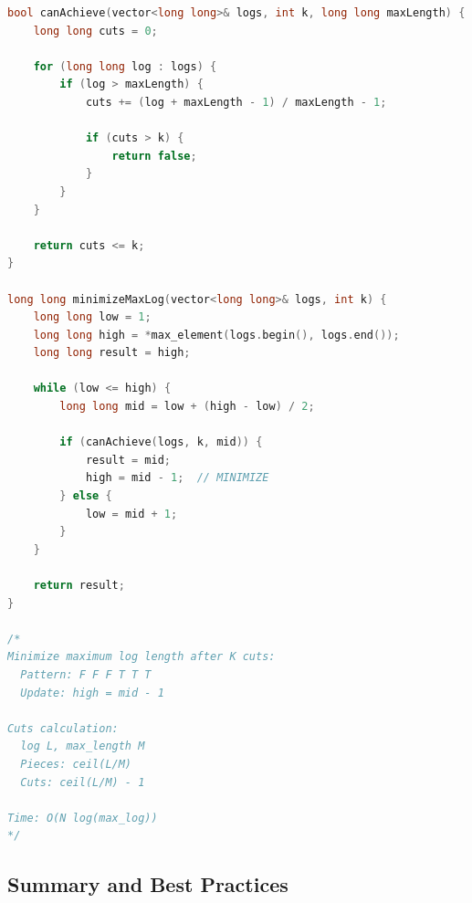\documentclass[11pt,a4paper,oneside]{book}
\begin{document}
\begin{lstlisting}[language=C++, caption=Complete Minimize Maximum Distance Solutions]
bool canAchieve(vector<long long>& logs, int k, long long maxLength) {
    long long cuts = 0;
    
    for (long long log : logs) {
        if (log > maxLength) {
            cuts += (log + maxLength - 1) / maxLength - 1;
            
            if (cuts > k) {
                return false;
            }
        }
    }
    
    return cuts <= k;
}

long long minimizeMaxLog(vector<long long>& logs, int k) {
    long long low = 1;
    long long high = *max_element(logs.begin(), logs.end());
    long long result = high;
    
    while (low <= high) {
        long long mid = low + (high - low) / 2;
        
        if (canAchieve(logs, k, mid)) {
            result = mid;
            high = mid - 1;  // MINIMIZE
        } else {
            low = mid + 1;
        }
    }
    
    return result;
}

/*
Minimize maximum log length after K cuts:
  Pattern: F F F T T T
  Update: high = mid - 1

Cuts calculation:
  log L, max_length M
  Pieces: ceil(L/M)
  Cuts: ceil(L/M) - 1

Time: O(N log(max_log))
*/
\end{lstlisting}

\subsection{Summary and Best Practices}
\end{document}
